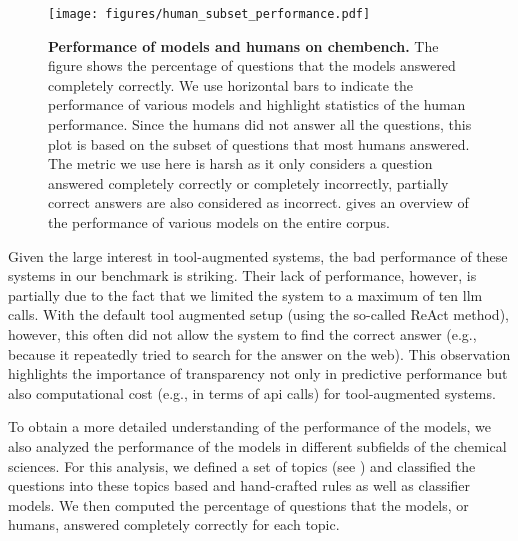 \documentclass[11pt, oneside]{article}
\begin{document}
\begin{refsection}
\begin{figure}
    \centering
    \texttt{[image: figures/human\_subset\_performance.pdf]}
    \caption{\textbf{Performance of models and humans on chembench.} The figure shows the percentage of questions that the models answered completely correctly. We use horizontal bars to indicate the performance of various models and highlight statistics of the human performance. 
    Since the humans did not answer all the questions, this plot is based on the subset of questions that most humans answered.
    The metric we use here is harsh as it only considers a question answered completely correctly or completely incorrectly, partially correct answers are also considered as incorrect.
     gives an overview of the performance of various models on the entire corpus.
    }
    \label{fig:human_vs_models_bar}
\end{figure}

Given the large interest in tool-augmented systems, the bad performance of these systems in our benchmark is striking. 
Their lack of performance, however, is partially due to the fact that we limited the system to a maximum of ten \gls{llm} calls.
With the default tool augmented setup (using the so-called ReAct method\autocite{yao2023react}), however, this often did not allow the system to find the correct answer (e.g., because it repeatedly tried to search for the answer on the web).
This observation highlights the importance of transparency not only in predictive performance but also computational cost (e.g., in terms of \gls{api} calls) for tool-augmented systems.


To obtain a more detailed understanding of the performance of the models, we also analyzed the performance of the models in different subfields of the chemical sciences.
For this analysis, we defined a set of topics (see ) and classified the questions into these topics based and hand-crafted rules as well as classifier models.
We then computed the percentage of questions that the models, or humans, answered completely correctly for each topic.




\end{refsection}
\end{document}
